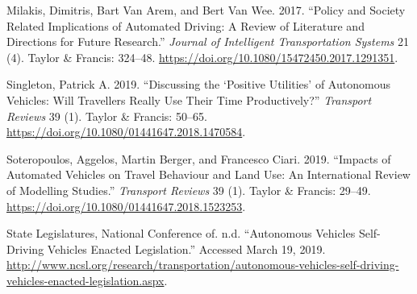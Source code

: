 \documentclass[12pt,]{article}
\begin{document}
\leavevmode\hypertarget{ref-milakis2017policy}{}%
Milakis, Dimitris, Bart Van Arem, and Bert Van Wee. 2017. ``Policy and
Society Related Implications of Automated Driving: A Review of
Literature and Directions for Future Research.'' \emph{Journal of
Intelligent Transportation Systems} 21 (4). Taylor \& Francis: 324--48.
\url{https://doi.org/10.1080/15472450.2017.1291351}.

\leavevmode\hypertarget{ref-singleton2019discussing}{}%
Singleton, Patrick A. 2019. ``Discussing the `Positive Utilities' of
Autonomous Vehicles: Will Travellers Really Use Their Time
Productively?'' \emph{Transport Reviews} 39 (1). Taylor \& Francis:
50--65. \url{https://doi.org/10.1080/01441647.2018.1470584}.

\leavevmode\hypertarget{ref-soteropoulos2019impacts}{}%
Soteropoulos, Aggelos, Martin Berger, and Francesco Ciari. 2019.
``Impacts of Automated Vehicles on Travel Behaviour and Land Use: An
International Review of Modelling Studies.'' \emph{Transport Reviews} 39
(1). Taylor \& Francis: 29--49.
\url{https://doi.org/10.1080/01441647.2018.1523253}.

\leavevmode\hypertarget{ref-NCSL2019AV}{}%
State Legislatures, National Conference of. n.d. ``Autonomous Vehicles
\textbar{} Self-Driving Vehicles Enacted Legislation.'' Accessed March
19, 2019.
\url{http://www.ncsl.org/research/transportation/autonomous-vehicles-self-driving-vehicles-enacted-legislation.aspx}.
\end{document}
